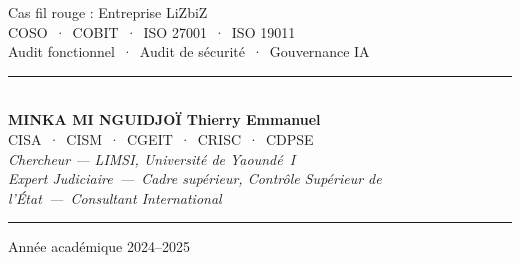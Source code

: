 \documentclass[12pt, a4paper, twoside, openright]{book}
\begin{document}
\begin{titlepage}
\vspace{2cm}

\begin{center}
    {\color{white!70!gray}\small
        \quad Cas fil rouge : Entreprise LiZbiZ}\\[0.5ex]
    {\color{white!70!gray}\small
        \quad COSO~·~COBIT~·~ISO 27001~·~ISO 19011}\\[0.5ex]
    {\color{white!70!gray}\small
        \quad Audit fonctionnel~·~Audit de sécurité~·~Gouvernance IA}
\end{center}

\vfill

\begin{center}
    {\color{CouleurAccent}\rule{0.7\linewidth}{1.2pt}}\\[1.2ex]
    {\color{white}\large\bfseries MINKA MI NGUIDJOÏ Thierry Emmanuel}\\[0.4ex]
    {\color{white!80!gray}\small
        CISA~·~CISM~·~CGEIT~·~CRISC~·~CDPSE}\\[0.3ex]
    {\color{white!70!gray}\footnotesize\itshape
        Chercheur — LIMSI, Université de Yaoundé~I}\\[0.3ex]
    {\color{white!70!gray}\footnotesize\itshape
        Expert Judiciaire~—~Cadre supérieur, Contrôle Supérieur de l'État~—~Consultant International}\\[1.2ex]
    {\color{CouleurAccent}\rule{0.7\linewidth}{1.2pt}}
\end{center}

\vspace{0.6cm}

\begin{center}
    {\color{white!60!gray}\small Année académique 2024--2025}
\end{center}

\afterpage{\nopagecolor}
\end{titlepage}

\clearpage
\thispagestyle{empty}
\vspace*{\fill}
\end{document}
